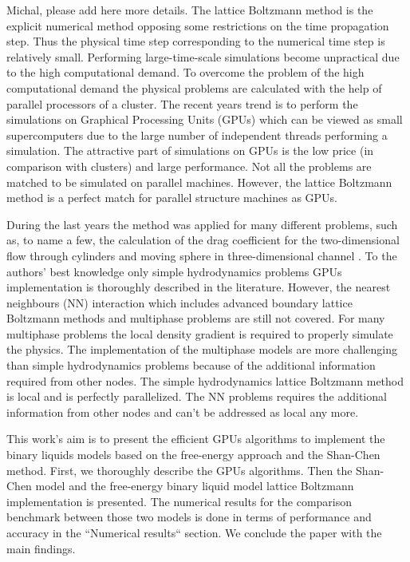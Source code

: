 \documentclass[mathpazo,sort,numbers]{cicp}
\begin{document}
{\color{red} Michal, please add here more details.}
The lattice Boltzmann method is the explicit numerical method opposing some restrictions on the
time propagation step. Thus the physical time step corresponding to the numerical time step is
relatively small. Performing large-time-scale simulations become unpractical due to the high
computational demand. To overcome the problem of the high computational demand the physical problems
are calculated with the help of parallel processors of a cluster. The recent years trend is to perform
the simulations on Graphical Processing Units (GPUs) which can be viewed as small supercomputers
due to the large number of independent threads performing a simulation. The attractive part
of simulations on GPUs is the low price (in comparison with clusters) and large performance.
Not all the problems are matched to be simulated on parallel machines. However, the lattice
Boltzmann method is a perfect match for parallel structure machines as GPUs.

During the last years the method was applied for many different problems, such as, to name
a few, the calculation of the drag coefficient for the two-dimensional flow through
cylinders \cite{tolke-twod} and moving sphere in three-dimensional channel \cite{tolke-GPU}.
To the authors' best knowledge only simple hydrodynamics problems GPUs implementation is
thoroughly described in the literature. However, the nearest neighbours (NN) interaction
which includes advanced boundary lattice Boltzmann methods and multiphase problems are
still not covered. For many multiphase problems the local density gradient is required
to properly simulate the physics. The implementation of the multiphase models are more
challenging than simple hydrodynamics problems because of the additional information
required from other nodes. The simple hydrodynamics lattice Boltzmann method is local
and is perfectly parallelized. The NN problems requires the additional information
from other nodes and can't be addressed as local any more.

This work's aim is to present the efficient GPUs algorithms to implement the binary
liquids models based on the free-energy approach and the Shan-Chen method. First, we
thoroughly describe the GPUs algorithms. Then the Shan-Chen model and the free-energy
binary liquid model lattice Boltzmann implementation is presented. The numerical results
for the comparison benchmark between those two models is done in terms of performance
and accuracy in the ``Numerical results`` section. We conclude the paper with the main findings.
\end{document}
